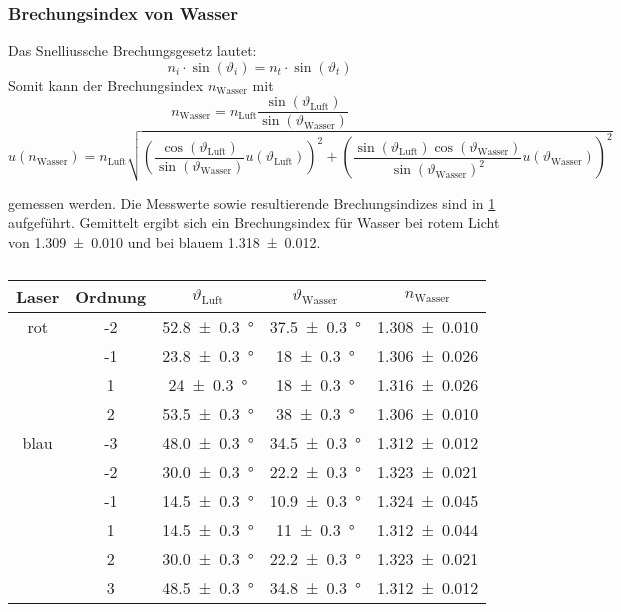 \documentclass[
	a4paper,
	12pt,
	pagesize,
	ngerman
]{scrartcl}
\begin{document}
	\subsubsection{Brechungsindex von Wasser}
	Das Snelliussche Brechungsgesetz lautet:
	\begin{equation}
		n_i \cdot \sin(\vartheta_i) = n_t \cdot \sin(\vartheta_t)
		\label{eq_snellius}
	\end{equation}
	Somit kann der Brechungsindex $n_\text{Wasser}$  mit 
	\begin{equation}
		n_\text{Wasser} = n_\text{Luft}\frac{\sin(\vartheta_\text{Luft})}{\sin(\vartheta_\text{Wasser})}
	\end{equation}
	\begin{equation}
		u(n_\text{Wasser}) = n_\text{Luft} \sqrt{\left(\frac{\cos(\vartheta_\text{Luft})}{\sin(\vartheta_\text{Wasser})} u(\vartheta_\text{Luft})\right)^2 + \left(\frac{\sin(\vartheta_\text{Luft})\cos( \vartheta_\text{Wasser})}{\sin(\vartheta_\text{Wasser})^2}u(\vartheta_\text{Wasser})\right)^2}
	\end{equation}

	gemessen werden.
	Die Messwerte sowie resultierende Brechungsindizes sind in \cref{tab_wasser} aufgeführt.
	Gemittelt ergibt sich ein Brechungsindex für Wasser bei rotem Licht von \SI{1,309 +- 0,010}{} und bei blauem \SI{1,318 +- 0,012}{}.
	\begin{table}[H]
		\centering
		\begin{tabular}{ c | c | c | c | c}
			Laser & Ordnung & $\vartheta_\text{Luft}$ & $\vartheta_\text{Wasser}$ & $n_\text{Wasser}$ \\ \hline
			rot & -2 &\SI{52,8 +- 0,3}{\degree} & \SI{37,5 +-0,3}{\degree} & \SI{1,308 +- 0,010}{}\\
			& -1 &\SI{23,8 +- 0,3}{\degree} & \SI{18+-0,3}{\degree} & \SI{1,306 +- 0,026}{}\\
			& 1 &\SI{24 +- 0,3}{\degree} & \SI{18+-0,3}{\degree} & \SI{1,316 +- 0,026}{}\\
			& 2 &\SI{53,5 +- 0,3}{\degree} & \SI{38+-0,3}{\degree} & \SI{1,306 +- 0,010}{}\\ \hline
			blau & -3 & \SI{48,0 +- 0,3}{\degree}&\SI{34,5+-0,3}{\degree}& \SI{1,312 +- 0,012}{} \\
			& -2 & \SI{30,0 +- 0,3}{\degree}&\SI{22,2+-0,3}{\degree}& \SI{1,323 +- 0,021}{} \\
			& -1 & \SI{14,5 +- 0,3}{\degree}&\SI{10,9+-0,3}{\degree}& \SI{1,324 +- 0,045}{} \\
			& 1 & \SI{14,5 +- 0,3}{\degree}&\SI{11+-0,3}{\degree}& \SI{1,312 +- 0,044}{} \\
			& 2 & \SI{30,0 +- 0,3}{\degree}&\SI{22,2+-0,3}{\degree}& \SI{1,323 +- 0,021}{} \\
			& 3 & \SI{48,5 +- 0,3}{\degree}&\SI{34,8+-0,3}{\degree}& \SI{1,312 +- 0,012}{} \\

		\end{tabular}
		\caption{}
		\label{tab_wasser}
	\end{table}
	
\end{document}
